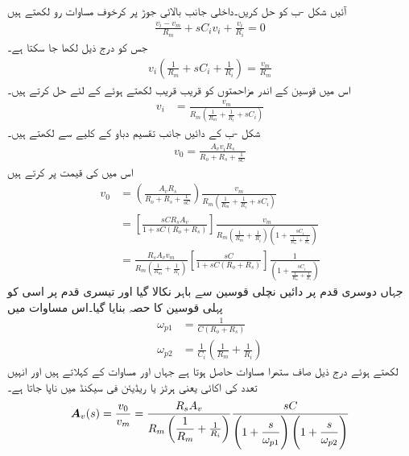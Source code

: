 آئیں شکل -ب کو حل کریں۔داخلی جانب بالائی جوڑ پر کرخوف مساوات رو لکھتے ہیں
\begin{align*}
\frac{v_i-v_m}{R_m}+sC_i v_i+\frac{v_i}{R_i}=0
\end{align*}
جس کو درج ذیل لکھا جا سکتا ہے۔
\begin{align*}
v_i\left(\frac{1}{R_m}+s C_i+\frac{1}{R_i}\right)=\frac{v_m}{R_m}
\end{align*}
اس میں قوسین کے اندر مزاحمتوں کو قریب قریب لکھتے ہوئے   کے لئے حل کرتے ہیں۔
\begin{align*}
v_i&=\frac{v_m}{R_m\left(\frac{1}{R_m}+\frac{1}{R_i}+s C_i\right)}
\end{align*}
شکل -ب کے دائیں جانب تقسیم دباو کے کلیے سے  لکھتے ہیں۔
\begin{align*}
v_0=\frac{A_v v_i R_s}{R_o+R_s+\frac{1}{s C}}
\end{align*}
اس میں  کی قیمت پر کرتے ہیں
\begin{align*}
v_0&=\left(\frac{A_v R_s}{R_o+R_s+\frac{1}{sC}}\right)\frac{v_m}{R_m\left(\frac{1}{R_m}+\frac{1}{R_i}+s C_i\right)}\\
&=\left[\frac{sC R_s A_v}{1+sC(R_o+R_s)}\right]\frac{v_m}{R_m\left(\frac{1}{R_m}+\frac{1}{R_i}\right)\left(1+\frac{s C_i}{\frac{1}{R_m}+\frac{1}{R_i}}\right)}\\
&=\frac{R_s A_v v_m}{R_m\left(\frac{1}{R_m}+\frac{1}{R_i}\right)}\left[\frac{sC}{1+sC(R_o+R_s)}\right]\frac{1}{\left(1+\frac{s C_i}{\frac{1}{R_m}+\frac{1}{R_i}}\right)}
\end{align*}
جہاں دوسری قدم پر دائیں نچلی قوسین سے  باہر نکالا گیا اور تیسری قدم پر اسی کو پہلی قوسین کا حصہ بنایا گیا۔اس مساوات میں
\begin{align*}
\omega_{p1}&=\frac{1}{C(R_o+R_s)}\\
\omega_{p2}&=\frac{1}{C_i}\left(\frac{1}{R_m}+\frac{1}{R_i}\right)
\end{align*}
لکھتے ہوئے درج ذیل صاف ستھرا مساوات حاصل ہوتا ہے جہاں  اور  مساوات کے    کہلاتے ہیں اور انہیں تعدد کی اکائی یعنی ہرٹز  یا ریڈیئن فی سیکنڈ  میں ناپا جاتا ہے۔
\begin{align}
{\ensuremath{{\boldsymbol{A}}}}_v(s)=\frac{v_0}{v_m}=\dfrac{R_s A_v }{R_m\left(\dfrac{1}{R_m}+\frac{1}{R_i}\right)}\dfrac{sC}{\left(1+\dfrac{s}{\omega_{p1}}\right)\left(1+\dfrac{s}{\omega_{p2}}\right)}
\end{align}
